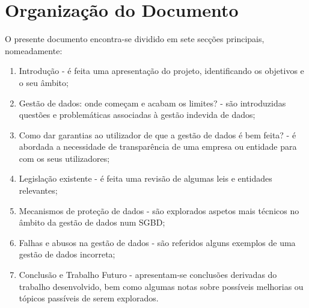 \section{Organização do Documento}
\label{sec:organ}
O presente documento encontra-se dividido em sete secções principais, nomeadamente:
\begin{enumerate}
    \item Introdução - é feita uma apresentação do projeto, identificando os objetivos e o seu âmbito;
    \item Gestão de dados: onde começam e acabam os limites? - são introduzidas questões e problemáticas associadas à gestão indevida de dados;
    \item Como dar garantias ao utilizador de que a gestão de dados é bem feita? - é abordada a necessidade de transparência de uma empresa ou entidade para com os seus utilizadores;
    \item Legislação existente - é feita uma revisão de algumas leis e entidades relevantes;
    \item Mecanismos de proteção de dados - são explorados aspetos mais técnicos no âmbito da gestão de dados num \ac{SGBD};
    \item Falhas e abusos na gestão de dados - são referidos alguns exemplos de uma gestão de dados incorreta;
    \item Conclusão e Trabalho Futuro - apresentam-se conclusões derivadas do trabalho desenvolvido, bem como algumas notas sobre possíveis melhorias ou tópicos passíveis de serem explorados.
\end{enumerate}